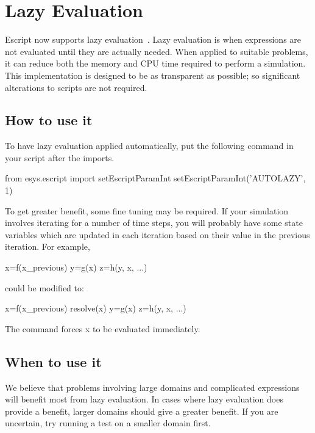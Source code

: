 \section{Lazy Evaluation}
\label{sec:lazy}
Escript now supports lazy evaluation~\cite{lazyauspdc}.
Lazy evaluation is when expressions are not evaluated until they are actually
needed.
When applied to suitable problems, it can reduce both the memory and CPU time
required to perform a simulation.
This implementation is designed to be as transparent as possible; so
significant alterations to scripts are not required.

\subsection*{How to use it}
To have lazy evaluation applied automatically, put the following command in
your script after the imports.

\begin{python}
  from esys.escript import setEscriptParamInt
  setEscriptParamInt('AUTOLAZY', 1)
\end{python}

To get greater benefit, some fine tuning may be required.
If your simulation involves iterating for a number of time steps,
you will probably have some state variables which are updated in
each iteration based on their value in the previous iteration.
For example,

\begin{python}
  x=f(x_previous)
  y=g(x)
  z=h(y, x, ...)
\end{python}

could be modified to:

\begin{python}
  x=f(x_previous)
  resolve(x)
  y=g(x)
  z=h(y, x, ...)
\end{python}

The  command forces x to be evaluated immediately.

\subsection*{When to use it}
We believe that problems involving large domains and complicated expressions
will benefit most from lazy evaluation.
In cases where lazy evaluation does provide a benefit, larger domains should
give a greater benefit.
If you are uncertain, try running a test on a smaller domain first.

